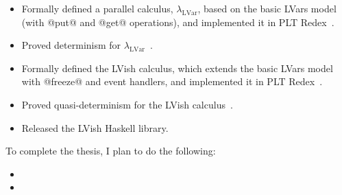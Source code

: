 \documentclass{article}
\begin{document}
\begin{itemize}
  \item Formally defined a parallel calculus,
    $\lambda_{\textrm{LVar}}$, based on the basic LVars model (with
    @put@ and @get@ operations), and implemented it in PLT
    Redex~\cite{LVars-paper}.

  \item Proved determinism for
    $\lambda_{\textrm{LVar}}$~\cite{LVars-paper, LVars-TR}.

  \item Formally defined the LVish calculus, which extends the basic
    LVars model with @freeze@ and event handlers, and implemented it
    in PLT Redex~\cite{Freeze-paper}.

  \item Proved quasi-determinism for the LVish
    calculus~\cite{Freeze-paper, Freeze-TR}.

  \item Released the LVish Haskell library.
\end{itemize}
To complete the thesis, I plan to do the following:
\begin{itemize}
\item {}
\item {}
\end{itemize}



\end{document}
